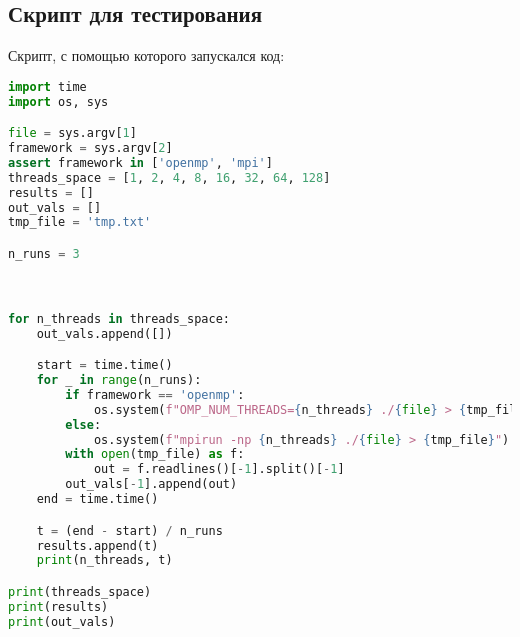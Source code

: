 \subsection{Скрипт для тестирования}
Скрипт, с помощью которого запускался код:
\begin{lstlisting}[language=python]
import time
import os, sys

file = sys.argv[1]
framework = sys.argv[2]
assert framework in ['openmp', 'mpi']
threads_space = [1, 2, 4, 8, 16, 32, 64, 128]
results = []
out_vals = []
tmp_file = 'tmp.txt'

n_runs = 3



for n_threads in threads_space:
    out_vals.append([])

    start = time.time()
    for _ in range(n_runs):
        if framework == 'openmp': 
            os.system(f"OMP_NUM_THREADS={n_threads} ./{file} > {tmp_file}")
        else:
            os.system(f"mpirun -np {n_threads} ./{file} > {tmp_file}")
        with open(tmp_file) as f:
            out = f.readlines()[-1].split()[-1]
        out_vals[-1].append(out)
    end = time.time()

    t = (end - start) / n_runs
    results.append(t)
    print(n_threads, t)

print(threads_space)
print(results)
print(out_vals)
\end{lstlisting}
